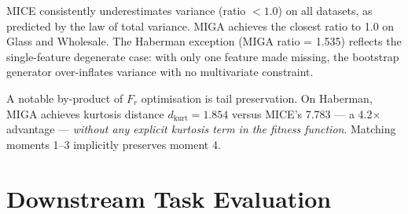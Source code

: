 MICE consistently underestimates variance (ratio $< 1.0$) on all datasets, as predicted by the law of total variance. MIGA achieves the closest ratio to 1.0 on Glass and Wholesale. The Haberman exception (MIGA ratio = 1.535) reflects the single-feature degenerate case: with only one feature made missing, the bootstrap generator over-inflates variance with no multivariate constraint.

A notable by-product of $F_r$ optimisation is tail preservation. On Haberman, MIGA achieves kurtosis distance $d_{\text{kurt}} = 1.854$ versus MICE's 7.783 --- a 4.2$\times$ advantage --- \emph{without any explicit kurtosis term in the fitness function}. Matching moments 1--3 implicitly preserves moment 4.

\section{Downstream Task Evaluation}

